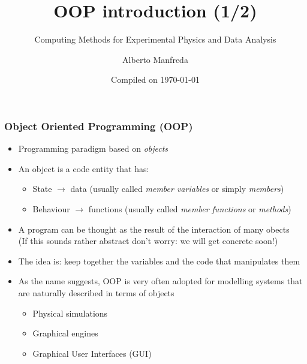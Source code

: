 \documentclass[9pt]{beamer}
\title{OOP introduction (1/2)}
\subtitle{Computing Methods for Experimental Physics and Data Analysis}
\date{Compiled on \today}
\author{Alberto Manfreda}
\institute[INFN]{INFN--Pisa}
\begin{document}
\titleframe


\begin{frame}
  \frametitle{Object Oriented Programming (OOP)}
  
  \begin{itemize}
    \small
    \item Programming paradigm based on \emph{objects}
    \bigskip
    \item An object is a code entity that has:
    \smallskip
    \begin{itemize}
      \item \alert{State} $\rightarrow$ data (usually called \emph{member variables} or simply \emph{members})
      \smallskip
      \item \alert{Behaviour} $\rightarrow$ functions (usually called \emph{member functions} or \emph{methods})
    \end{itemize}
    \medskip
    \item A program can be thought as the result of the interaction of many obects \\
          (If this sounds rather abstract don't worry: we will get concrete soon!)
    \bigskip
    \item The idea is: keep together the variables and the code that manipulates them
    \bigskip
    \item As the name suggests, OOP is very often adopted for modelling systems that are naturally
          described in terms of objects  
    \begin{itemize}
      \smallskip
      \item Physical simulations
      \smallskip
      \item Graphical engines
      \smallskip
      \item Graphical User Interfaces (GUI) 
    \end{itemize}

  \end{itemize}
\end{frame}
\end{document}
